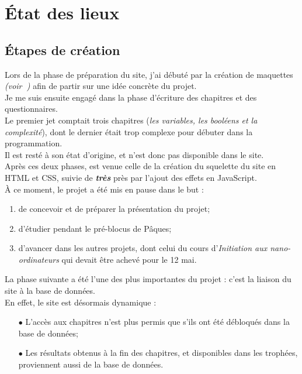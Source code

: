 \section{État des lieux}
\label{sec:etat-lieux}


\subsection{Étapes de création}
\label{subsec:etapes-de-création}

Lors de la phase de préparation du site, j'ai débuté par la création de maquettes \textit{(voir\textbf{~})} afin de partir sur une idée concrète du projet.\\

Je me suis ensuite engagé dans la phase d'écriture des chapitres et des questionnaires. \\
Le premier jet comptait trois chapitres (\textit{les variables, les booléens et la complexité}), dont le dernier était trop complexe pour débuter dans la programmation.\\
Il est resté à son état d'origine, et n'est donc pas disponible dans le site.\\

Après ces deux phases, est venue celle de la création du squelette du site en HTML et CSS, suivie de \textit{\textbf{très}} près par l'ajout des effets en JavaScript. \\

À ce moment, le projet a été mis en pause dans le but :
\begin{enumerate}

    \item de concevoir et de préparer la présentation du projet;
    \item d'étudier pendant le pré-blocus de Pâques;
    \item d'avancer dans les autres projets, dont celui du cours d'\textit{Initiation aux nano-ordinateurs} qui devait être achevé pour le 12 mai.\\
    
\end{enumerate}

La phase suivante a été l'une des plus importantes du projet : c'est la liaison du site à la base de données. \\
En effet, le site est désormais dynamique :
\begin{itemize}

    \item[$\bullet$] L'accès aux chapitres n'est plus permis que s'ils ont été débloqués dans la base de données;
    \item[$\bullet$] Les résultats obtenus à la fin des chapitres, et disponibles dans les trophées, proviennent aussi de la base de données.\\
    
\end{itemize}

